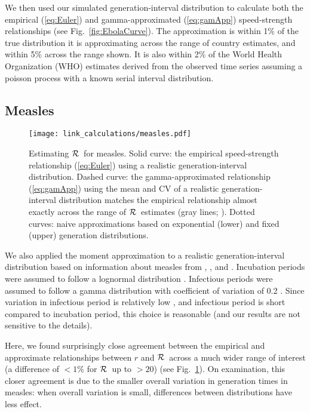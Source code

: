 \documentclass[12pt]{article}
\newcommand{\RR}{\ensuremath{{\cal R}}}
\newcommand{\eref}[1]{(\ref{eq:#1})}
\newcommand{\fref}[1]{Fig.~\ref{fig:#1}}
\begin{document}
We then used our simulated generation-interval distribution to calculate both the empirical \eref{Euler} and gamma-approximated \eref{gamApp} speed-strength relationships (see \fref{EbolaCurve}). The approximation is within 1\% of the true distribution it is approximating across the range of country estimates, and within 5\% across the range shown. It is also within 2\% of the World Health Organization (WHO) estimates derived from the observed time series assuming a poisson process with a known serial interval distribution. 

\subsection{Measles}
\label{MeaslesEx}

\begin{figure}[htbp] \centering
	\texttt{[image: link\_calculations/measles.pdf]}
	\caption{Estimating \RR~for measles.
		Solid curve: the empirical speed-strength relationship \eref{Euler} using a realistic generation-interval distribution.
		Dashed curve: the gamma-approximated relationship \eref{gamApp} using the mean and CV of a realistic generation-interval distribution matches the empirical relationship almost exactly across the range of \RR\ estimates (gray lines; \cite{anderson1982directly}).
		Dotted curves: naive approximations based on exponential (lower) and fixed (upper) generation distributions.
	}
	\label{fig:measlesCurve}
\end{figure}

We also applied the moment approximation to a realistic generation-interval distribution based on information about measles from \cite{LessReic09}, \cite{Lloy01}, and \cite{anderson1982directly}. 
Incubation periods were assumed to follow a lognormal distribution \cite{LessReic09}. 
Infectious periods were assumed to follow a gamma distribution with coefficient of variation of 0.2 \cite{simpson1952infectiousness,Lloy01,KeelGren97}. Since variation in infectious period is relatively low \cite{simpson1952infectiousness,KeelGren97}, and infectious period is short compared to incubation period, this choice is reasonable (and our results are not sensitive to the details).

Here, we found surprisingly close agreement between the empirical and approximate relationships between $r$ and \RR\ across a much wider range of interest (a difference of $<1\%$ for \RR\ up to $>20$) (see \fref{measlesCurve}).
On examination, this closer agreement is due to the smaller overall variation in generation times in measles: when overall variation is small, differences between distributions have less effect.
\end{document}
